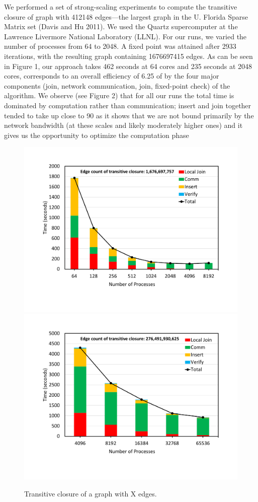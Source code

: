 We performed a set of strong-scaling experiments to compute the transitive closure of graph with 412148
edges—the largest graph in the U. Florida Sparse Matrix set (Davis and Hu 2011). We used the Quartz supercomputer
at the Lawrence Livermore National Laboratory (LLNL). For our runs, we varied the number of processes
from 64 to 2048. A fixed point was attained after 2933 iterations, with the resulting graph containing 1676697415
edges. As can be seen in Figure 1, our approach takes 462 seconds at 64 cores and 235 seconds at 2048 cores, corresponds
to an overall efficiency of 6.25%
of by the four major components (join, network communication, join, fixed-point check) of the algorithm. We
observe (see Figure 2) that for all our runs the total time is dominated by computation rather than communication;
insert and join together tended to take up close to 90%
as it shows that we are not bound primarily by the network bandwidth (at these scales and likely moderately
higher ones) and it gives us the opportunity to optimize the computation phase

\begin{figure}[t]
	{\includegraphics[width=.50\textwidth,  trim={0cm 0cm 0cm 0cm, 
			clip}]{results/TC_1_6_Billion_final.pdf}}\hfill%
	{\includegraphics[width=.50\textwidth,  trim={0cm 0cm 0cm 0cm,
			clip}]{results/TC_260Billion_Final.pdf}}\hfill%
	\centering
	\caption{Transitive closure of a graph with X edges.}
	\label{fig:tc_small}
\end{figure}


